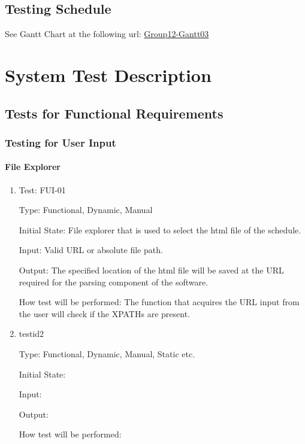 \documentclass[12pt, titlepage]{article}
\begin{document}
\subsection{Testing Schedule}
See Gantt Chart at the following url: \color{blue}
\href{https://gitlab.cas.mcmaster.ca/liangw15/3XA3Project/blob/master/ProjectSchedule/Group12_Gantt03.pdf}{ Group12-Gantt03}

\color{black}

\section{System Test Description}
	
\subsection{Tests for Functional Requirements}

\subsubsection{Testing for User Input}
		
\paragraph{File Explorer}

\begin{enumerate}

\item{Test: FUI-01\\}

Type: Functional, Dynamic, Manual
					
Initial State:  File explorer that is used to select the html file of the schedule.
					
Input: Valid URL or absolute file path.

					
Output: The specified location of the html file will be saved at the URL required for the parsing component of the software.

					
How test will be performed: The function that acquires the URL input from the user will check if the XPATHs are present.

					
\item{testid2\\}

Type: Functional, Dynamic, Manual, Static etc.
					
Initial State: 
					
Input: 
					
Output: 
					
How test will be performed: 

\end{enumerate}
\end{document}
